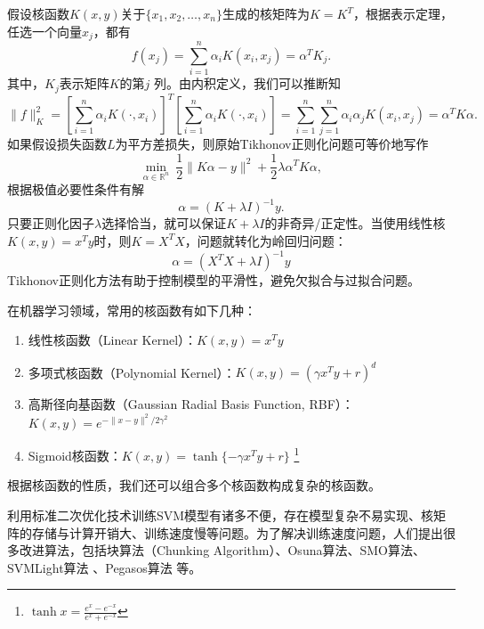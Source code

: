 假设核函数$K(x,y)$关于$\{x_1,x_2,\ldots,x_n\}$生成的核矩阵为$K = K^T$，根据表示定理，任选一个向量$x_j$，都有
\begin{equation}
    f(x_j)=\sum\limits_{i=1}^n \alpha_i K(x_i,x_j)=\alpha^T K_j.
\end{equation}
其中，$K_j$表示矩阵$K$的第$j$ 列。由内积定义，我们可以推断知
\begin{equation}
    \|f\|_K^2 = [\sum\limits_{i=1}^n \alpha_i K(\cdot,x_i)]^T [\sum\limits_{i=1}^n \alpha_i K(\cdot,x_i)] = \sum\limits_{i=1}^n \sum\limits_{j=1}^n \alpha_i\alpha_j K(x_i,x_j) = \alpha^T K \alpha.
\end{equation}
如果假设损失函数$L$为平方差损失，则原始Tikhonov正则化问题可等价地写作
\begin{equation}
    \min\limits_{\alpha\in\mathbb{R}^n}~\frac{1}{2} \|K \alpha - y\|^2 + \frac{1}{2} \lambda \alpha^T K \alpha,
\end{equation}
根据极值必要性条件有解
\begin{equation}
    \alpha = (K  + \lambda I)^{-1} y.
\end{equation}
只要正则化因子$\lambda$选择恰当，就可以保证$K + \lambda I$的非奇异/正定性。当使用线性核$K(x,y)=x^T y$时，则$K = X^T X$，问题就转化为岭回归问题：
\begin{equation}
    \alpha = (X^T X  + \lambda I)^{-1} y
\end{equation}
Tikhonov正则化方法有助于控制模型的平滑性，避免欠拟合与过拟合问题。

在机器学习领域，常用的核函数有如下几种：
\begin{enumerate}[（1）]
  \item 线性核函数（Linear Kernel）：$K(x,y) = x^T y$
  \item 多项式核函数（Polynomial Kernel）：$K(x,y) = (\gamma x^T y + r)^d$
  \item 高斯径向基函数（Gaussian Radial Basis Function, RBF）：$K(x,y) = e^{-\|x - y\|^2/2\gamma^2}$
  \item Sigmoid核函数：$K(x,y) = \tanh\{-\gamma x^T y + r\}$
  \footnote{$\tanh x = \frac{e^x - e^{-x}}{e^x + e^{-x}}$}
\end{enumerate}
根据核函数的性质，我们还可以组合多个核函数构成复杂的核函数。

利用标准二次优化技术训练SVM模型有诸多不便，存在模型复杂不易实现、核矩阵的存储与计算开销大、训练速度慢等问题。为了解决训练速度问题，人们提出很多改进算法，包括块算法（Chunking Algorithm）\cite{vapnik1982estimation}、Osuna算法\cite{osuna1997improved}、SMO算法\cite{platt1998sequential}、SVMLight算法
\cite{joachims1999making,joachims2002learning}、Pegasos算法\cite{shalev2007pegasos} 等。

